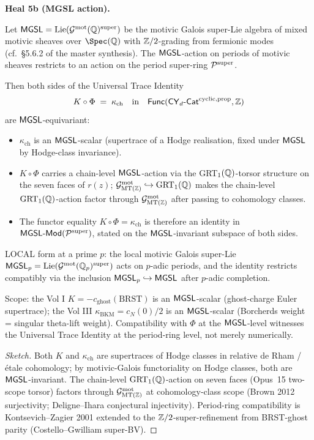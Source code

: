 \textbf{Heal 5b (MGSL action).}

\begin{theorem}\ClaimStatusScoped
\label{thm:mgsl-uti}
Let $\mathsf{MGSL} = \mathrm{Lie}(\mathcal{G}^{\mathrm{mot}}(\mathbb{Q})^{\mathrm{super}})$ be the motivic
Galois super-Lie algebra of mixed motivic sheaves over $\Spec(\QQ)$
with $\mathbb{Z}/2$-grading from fermionic modes (cf.\ §5.6.2 of the master
synthesis). The $\mathsf{MGSL}$-action on periods of motivic sheaves restricts
to an action on the period super-ring $\mathcal{P}^{\mathrm{super}}$.

Then both sides of the Universal Trace Identity
\[
  K \circ \Phi \;=\; \kappa_{\mathrm{ch}}
  \quad\text{in}\quad \mathsf{Func}(\mathsf{CY}_d\text{-}\mathsf{Cat}^{\mathrm{cyclic}, \mathrm{prop}}, \mathbb{Z})
\]
are $\mathsf{MGSL}$-equivariant:
\begin{itemize}
\item[(i)] $\kappa_{\mathrm{ch}}$ is an $\mathsf{MGSL}$-scalar (supertrace of
a Hodge realisation, fixed under $\mathsf{MGSL}$ by Hodge-class invariance).
\item[(ii)] $K \circ \Phi$ carries a chain-level $\mathsf{MGSL}$-action via
the GRT$_1(\mathbb{Q})$-torsor structure on the seven faces of $r(z)$;
$\mathcal{G}^{\mathrm{mot}}_{\mathrm{MT}(\mathbb{Z})} \hookrightarrow \mathrm{GRT}_1(\mathbb{Q})$ makes the chain-level
$\mathrm{GRT}_1(\mathbb{Q})$-action factor through $\mathcal{G}^{\mathrm{mot}}_{\mathrm{MT}(\mathbb{Z})}$ after passing
to cohomology classes.
\item[(iii)] The functor equality $K \circ \Phi = \kappa_{\mathrm{ch}}$
is therefore an identity in $\mathsf{MGSL}\text{-}\mathsf{Mod}(\mathcal{P}^{\mathrm{super}})$,
stated on the $\mathsf{MGSL}$-invariant subspace of both sides.
\end{itemize}
LOCAL form at a prime $p$: the local motivic Galois super-Lie
$\mathsf{MGSL}_p = \mathrm{Lie}(\mathcal{G}^{\mathrm{mot}}(\mathbb{Q}_p)^{\mathrm{super}})$ acts on
$p$-adic periods, and the identity restricts compatibly via the
inclusion $\mathsf{MGSL}_p \hookrightarrow \mathsf{MGSL}$ after $p$-adic completion.

Scope: the Vol I $K = -c_{\mathrm{ghost}}(\mathrm{BRST})$ is an
$\mathsf{MGSL}$-scalar (ghost-charge Euler supertrace); the Vol III
$\kappa_{\mathrm{BKM}} = c_N(0)/2$ is an $\mathsf{MGSL}$-scalar (Borcherds
weight = singular theta-lift weight). Compatibility with $\Phi$ at the
$\mathsf{MGSL}$-level witnesses the Universal Trace Identity at the period-ring
level, not merely numerically.
\end{theorem}

\begin{proof}[Sketch]
Both $K$ and $\kappa_{\mathrm{ch}}$ are supertraces of Hodge classes in
relative de Rham / \'etale cohomology; by motivic-Galois functoriality
on Hodge classes, both are $\mathsf{MGSL}$-invariant. The chain-level
$\mathrm{GRT}_1(\mathbb{Q})$-action on seven faces (Opus~15 two-scope torsor) factors
through $\mathcal{G}^{\mathrm{mot}}_{\mathrm{MT}(\mathbb{Z})}$ at cohomology-class scope (Brown 2012
surjectivity; Deligne--Ihara conjectural injectivity). Period-ring
compatibility is Kontsevich--Zagier 2001 extended to the
$\mathbb{Z}/2$-super-refinement from BRST-ghost parity (Costello--Gwilliam
super-BV).
\end{proof}

